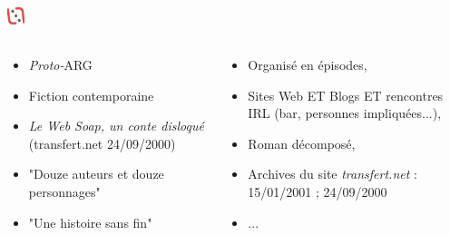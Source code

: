\documentclass[slidetop,11pt]{beamer}
\def\moreInFrameTitleLeftt{\includegraphics[height=0.5cm]{img/ligueludique-0.png}~~~~~}
\begin{document}
\subsubsection{\sectionPartIIaVII}
\begin{frame}
	\frametitle{\moreInFrameTitleLeftt \sectionPartIIaVII }
	\begin{columns}[T]
		\begin{column}[T]{5.00cm}
			\begin{itemize}
				\item \emph{Proto-}ARG
				\item Fiction contemporaine
				\item \emph{Le Web Soap, un conte disloqu{\'e}} (transfert.net 24/09/2000)
				\item "Douze auteurs et douze personnages"
				\item "Une histoire sans fin"
			\end{itemize}
		\end{column}
		\begin{column}[T]{5.00cm}
			\begin{itemize}
				\item Organis{\'e} en {\'e}pisodes, 
				\item Sites Web ET Blogs ET rencontres IRL (bar, personnes impliqu{\'e}es...), 
				\item Roman d{\'e}compos{\'e}, 
				\item Archives du site \emph{transfert.net} : 15/01/2001 ; 24/09/2000
				\item ...
			\end{itemize}
		\end{column}
	\end{columns}
\end{frame} 


\def\sectionPartIIaVIII{Resistance Radio}
\end{document}
